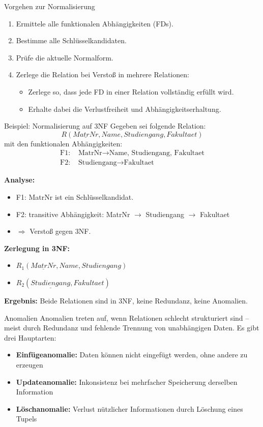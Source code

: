 \documentclass{article}
\begin{document}
\begin{block}{Vorgehen zur Normalisierung}
\begin{enumerate}
  \item Ermittele alle funktionalen Abhängigkeiten (FDs).
  \item Bestimme alle Schlüsselkandidaten.
  \item Prüfe die aktuelle Normalform.
  \item Zerlege die Relation bei Verstoß in mehrere Relationen:
  \begin{itemize}
    \item Zerlege so, dass jede FD in einer Relation vollständig erfüllt wird.
    \item Erhalte dabei die Verlustfreiheit und Abhängigkeitserhaltung.
  \end{itemize}
\end{enumerate}
\end{block}

\begin{block}{Beispiel: Normalisierung auf 3NF}
Gegeben sei folgende Relation:
\[
R(\underline{MatrNr}, Name, Studiengang, Fakultaet)
\]
mit den funktionalen Abhängigkeiten:
\begin{align*}
\text{F1: } & \text{MatrNr} \rightarrow \text{Name, Studiengang, Fakultaet} \\
\text{F2: } & \text{Studiengang} \rightarrow \text{Fakultaet}
\end{align*}

\textbf{Analyse:}
\begin{itemize}
  \item F1: MatrNr ist ein Schlüsselkandidat.
  \item F2: transitive Abhängigkeit: MatrNr $\rightarrow$ Studiengang $\rightarrow$ Fakultaet
  \item $\Rightarrow$ Verstoß gegen 3NF.
\end{itemize}

\textbf{Zerlegung in 3NF:}
\begin{itemize}
  \item $R_1(\underline{MatrNr}, Name, Studiengang)$
  \item $R_2(\underline{Studiengang}, Fakultaet)$
\end{itemize}

\textbf{Ergebnis:} Beide Relationen sind in 3NF, keine Redundanz, keine Anomalien.
\end{block}

\begin{block}{Anomalien}
Anomalien treten auf, wenn Relationen schlecht strukturiert sind – meist durch Redundanz und fehlende Trennung von unabhängigen Daten. Es gibt drei Hauptarten:
\begin{itemize}
  \item \textbf{Einfügeanomalie:} Daten können nicht eingefügt werden, ohne andere zu erzeugen
  \item \textbf{Updateanomalie:} Inkonsistenz bei mehrfacher Speicherung derselben Information
  \item \textbf{Löschanomalie:} Verlust nützlicher Informationen durch Löschung eines Tupels
\end{itemize}
\end{block}
\end{document}

